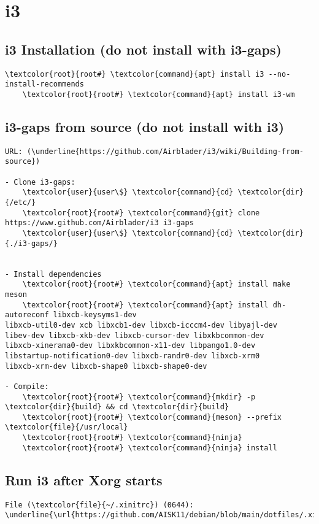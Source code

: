 \documentclass[10pt, a4paper, onecolumn, openany]{book} %
\begin{document}
\section{i3}
\subsection{i3 Installation (do not install with i3-gaps)}
\begin{Verbatim}[commandchars=\\\{\}]
    \textcolor{root}{root#} \textcolor{command}{apt} install i3 --no-install-recommends
    \textcolor{root}{root#} \textcolor{command}{apt} install i3-wm 
\end{Verbatim}
\subsection{i3-gaps from source (do not install with i3)}
\begin{Verbatim}[commandchars=\\\{\}]
URL: (\underline{https://github.com/Airblader/i3/wiki/Building-from-source})

- Clone i3-gaps:
    \textcolor{user}{user\$} \textcolor{command}{cd} \textcolor{dir}{/etc/}
    \textcolor{root}{root#} \textcolor{command}{git} clone https://www.github.com/Airblader/i3 i3-gaps
    \textcolor{user}{user\$} \textcolor{command}{cd} \textcolor{dir}{./i3-gaps/}


- Install dependencies
    \textcolor{root}{root#} \textcolor{command}{apt} install make meson
    \textcolor{root}{root#} \textcolor{command}{apt} install dh-autoreconf libxcb-keysyms1-dev 
libxcb-util0-dev xcb libxcb1-dev libxcb-icccm4-dev libyajl-dev
libev-dev libxcb-xkb-dev libxcb-cursor-dev libxkbcommon-dev 
libxcb-xinerama0-dev libxkbcommon-x11-dev libpango1.0-dev
libstartup-notification0-dev libxcb-randr0-dev libxcb-xrm0 
libxcb-xrm-dev libxcb-shape0 libxcb-shape0-dev

- Compile:
    \textcolor{root}{root#} \textcolor{command}{mkdir} -p \textcolor{dir}{build} && cd \textcolor{dir}{build}
    \textcolor{root}{root#} \textcolor{command}{meson} --prefix \textcolor{file}{/usr/local}
    \textcolor{root}{root#} \textcolor{command}{ninja}
    \textcolor{root}{root#} \textcolor{command}{ninja} install
\end{Verbatim}

\subsection{Run i3 after Xorg starts}
\begin{Verbatim}[commandchars=\\\{\}]
File (\textcolor{file}{~/.xinitrc}) (0644):
\underline{\url{https://github.com/AISK11/debian/blob/main/dotfiles/.xinitrc}}
\end{Verbatim}
\end{document}
